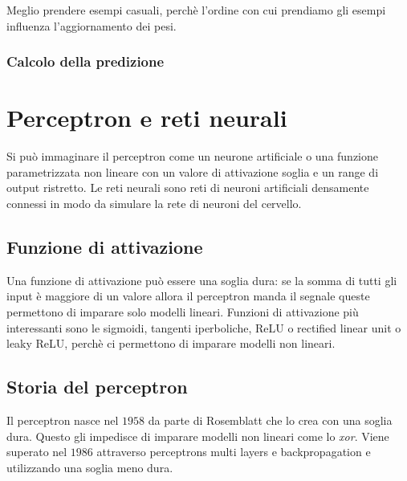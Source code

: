 		Meglio prendere esempi casuali, perch\`e l'ordine con cui prendiamo gli esempi influenza l'aggiornamento dei pesi.
		
		\subsubsection{Calcolo della predizione}
		

\section{Perceptron e reti neurali}
Si pu\`o immaginare il perceptron come un neurone artificiale o una funzione parametrizzata non lineare con un valore di attivazione soglia e un range di output ristretto.
Le reti neurali sono reti di neuroni artificiali densamente connessi in modo da simulare la rete di neuroni del cervello.

	\subsection{Funzione di attivazione}
	Una funzione di attivazione pu\`o essere una soglia dura: se la somma di tutti gli input \`e maggiore di un valore allora il perceptron manda il segnale queste permettono di imparare solo modelli lineari.
	Funzioni di attivazione pi\`u interessanti sono le sigmoidi, tangenti iperboliche, ReLU o rectified linear unit o leaky ReLU, perch\`e ci permettono di imparare modelli non lineari.
	
	\subsection{Storia del perceptron}
	Il perceptron nasce nel $1958$ da parte di Rosemblatt che lo crea con una soglia dura.
	Questo gli impedisce di imparare modelli non lineari come lo \emph{xor}.
	Viene superato nel $1986$ attraverso perceptrons multi layers e backpropagation e utilizzando una soglia meno dura.
